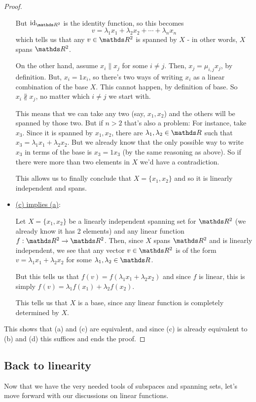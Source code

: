 \begin{proof}
\begin{itemize}
	But $\id_{\R^2}$ is the identity function, so this becomes
	\[v=\lambda_1x_1+\lambda_2x_2+\cdots+\lambda_n x_n\]which tells us that any $v\in \R^2$ is spanned by $X$ - in other words, $X$ spans $\R^2$.
	
	On the other hand, assume $x_i\parallel x_j$ for some $i\neq j$. Then, $x_j=\mu_{i,j} x_j$, by definition. But, $x_i=1x_i$, so there's two ways of writing $x_i$ as a linear combination of the base $X$. This cannot happen, by definition of base. So $x_i\nparallel x_j$, no matter which $i\neq j$ we start with.
	
	 This means that we can take any two (say, $x_1,x_2$) and the others will be spanned by those two. But if $n> 2$ that's also a problem: For instance, take $x_3$. Since it is spanned by $x_1,x_2$, there are $\lambda_1,\lambda_2\in \R$ such that $x_3=\lambda_1x_1+\lambda_2x_2$. But we already know that the only possible way to write $x_3$ in terms of the base is $x_3=1x_3$ (by the same reasoning as above). So if there were more than two elements in $X$ we'd have a contradiction.
	 
	 This allows us to finally conclude that $X=\{x_1,x_2\}$ and so it is linearly independent and spans.
	
	\item \underline{(c) implies (a)}:
	
	Let $X=\{x_1,x_2\}$ be a linearly independent spanning set for $\R^2$ (we already know it has 2 elements) and any linear function $f:\R^2\to\R^2$. Then, since $X$ spans $\R^2$ and is linearly independent, we see that any vector $v\in \R^2$ is of the form $v=\lambda_1 x_1+\lambda_2x_2$ for some $\lambda_1,\lambda_2\in \R$.
	
	 But this tells us that $f(v)=f(\lambda_1 x_1+\lambda_2x_2)$ and since $f$ is linear, this is simply $f(v)=\lambda_1 f(x_1)+\lambda_2 f(x_2)$.
	 
	 This tells us that $X$ is a base, since any linear function is completely determined by $X$.
\end{itemize}

This shows that (a) and (c) are equivalent, and since (c) is already equivalent to (b) and (d) this suffices and ends the proof.
\end{proof}

\newpage
\subsection{Back to linearity}

Now that we have the very needed tools of subspaces and spanning sets, let's move forward with our discussions on linear functions.


